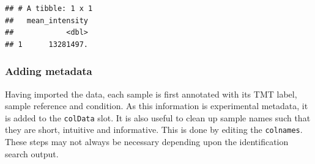 \documentclass[9pt,a4paper,]{extarticle}
\newenvironment{Shaded}{\begin{snugshade}}{\end{snugshade}}
\newcommand{\AttributeTok}[1]{\textcolor[rgb]{0.77,0.63,0.00}{#1}}
\newcommand{\DecValTok}[1]{\textcolor[rgb]{0.00,0.00,0.81}{#1}}
\newcommand{\DocumentationTok}[1]{\textcolor[rgb]{0.56,0.35,0.01}{\textbf{\textit{#1}}}}
\newcommand{\FunctionTok}[1]{\textcolor[rgb]{0.00,0.00,0.00}{#1}}
\newcommand{\NormalTok}[1]{#1}
\newcommand{\OtherTok}[1]{\textcolor[rgb]{0.56,0.35,0.01}{#1}}
\newcommand{\SpecialCharTok}[1]{\textcolor[rgb]{0.00,0.00,0.00}{#1}}
\newcommand{\StringTok}[1]{\textcolor[rgb]{0.31,0.60,0.02}{#1}}
\begin{document}
\begin{verbatim}
## # A tibble: 1 x 1
##   mean_intensity
##            <dbl>
## 1      13281497.
\end{verbatim}

\hypertarget{adding-metadata}{%
\subsubsection{Adding metadata}\label{adding-metadata}}

Having imported the data, each sample is first annotated with its TMT label,
sample reference and condition. As this information is experimental metadata, it
is added to the \texttt{colData} slot. It is also useful to clean up sample names such
that they are short, intuitive and informative. This is done by editing the
\texttt{colnames}. These steps may not always be necessary depending upon the
identification search output.

\begin{Shaded}
\end{Shaded}
\end{document}
